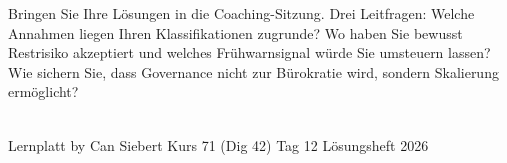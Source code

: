 \documentclass[11pt,a4paper,oneside]{article}
\begin{document}
\medskip
\begin{infobox}
Bringen Sie Ihre L\"osungen in die Coaching-Sitzung. Drei Leitfragen: Welche Annahmen liegen Ihren Klassifikationen zugrunde? Wo haben Sie bewusst Restrisiko akzeptiert \textendash{} und welches Fr\"uhwarnsignal w\"urde Sie umsteuern lassen? Wie sichern Sie, dass Governance nicht zur B\"urokratie wird, sondern Skalierung erm\"oglicht?
\end{infobox}

\vspace{1cm}
\noindent{\color{lpAccent}\rule{\linewidth}{0.6pt}}\\[4pt]
{\footnotesize\sffamily\color{lpGray}Lernplatt \textperiodcentered{} by Can Siebert \textperiodcentered{} Kurs 71 (Dig 42) \textperiodcentered{} Tag 12 \textperiodcentered{} L\"osungsheft \textperiodcentered{} \textcopyright{} 2026}
\end{document}

